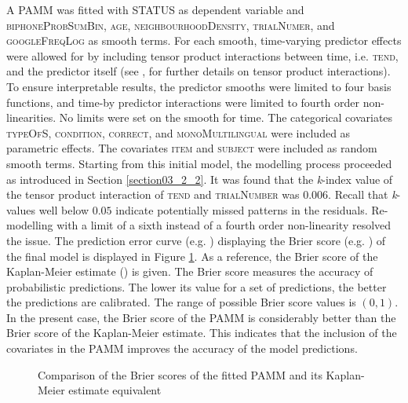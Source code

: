 A PAMM was fitted with STATUS as dependent variable and \textsc{biphoneProbSumBin}, \textsc{age}, \textsc{neighbourhoodDensity}, \textsc{trialNumer}, and \textsc{googleFreqLog} as smooth terms. For each smooth, time-varying predictor effects were allowed for by including tensor product interactions between time, i.e. \textsc{tend}, and the predictor itself (see \cite{Wood2017}, for further details on tensor product interactions). To ensure interpretable results, the predictor smooths were limited to four basis functions, and time-by predictor interactions were limited to fourth order non-linearities. No limits were set on the smooth for time. The categorical covariates \textsc{typeOfS}, \textsc{condition}, \textsc{correct}, and \textsc{monoMultilingual} were included as parametric effects. The covariates \textsc{item} and \textsc{subject} were included as random smooth terms. Starting from this initial model, the modelling process proceeded as introduced in Section \ref{section03_2_2}. It was found that the \textit{k}-index value of the tensor product interaction of \textsc{tend} and \textsc{trialNumber} was $0.006$. Recall that \textit{k}-values well below $0.05$ indicate potentially missed patterns in the residuals. Re-modelling with a limit of a sixth instead of a fourth order non-linearity resolved the issue. The prediction error curve (e.g. \cite{Mogensen2012}) displaying the Brier score (e.g. \cite{Brier1950, Gerds2006, Bradley2008}) of the final model is displayed in Figure \ref{fig:7_2}. As a reference, the Brier score of the Kaplan-Meier estimate (\cite{Kaplan1958}) is given. The Brier score measures the accuracy of probabilistic predictions. The lower its value for a set of predictions, the better the predictions are calibrated. The range of possible Brier score values is $(0,1)$. In the present case, the Brier score of the PAMM is considerably better than the Brier score of the Kaplan-Meier estimate. This indicates that the inclusion of the covariates in the PAMM improves the accuracy of the model predictions. 

\begin{figure}
    \centering
    
    \caption{Comparison of the Brier scores of the fitted PAMM and its Kaplan-Meier estimate equivalent}
    \label{fig:7_2}
\end{figure}

